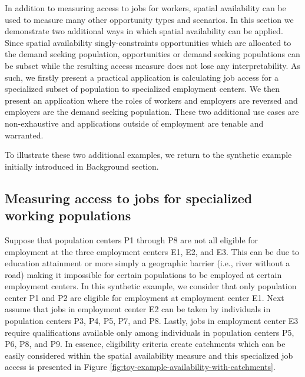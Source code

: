 \documentclass[]{elsarticle} %
\begin{document}
In addition to measuring access to jobs for workers, spatial
availability can be used to measure many other opportunity types and
scenarios. In this section we demonstrate two additional ways in which
spatial availability can be applied. Since spatial availability
singly-constraints opportunities which are allocated to the demand
seeking population, opportunities or demand seeking populations can be
subset while the resulting access measure does not lose any
interpretability. As such, we firstly present a practical application is
calculating job access for a specialized subset of population to
specialized employment centers. We then present an application where the
roles of workers and employers are reversed and employers are the demand
seeking population. These two additional use cases are non-exhaustive
and applications outside of employment are tenable and warranted.

To illustrate these two additional examples, we return to the synthetic
example initially introduced in
\protect\hypertarget{background}{}{Background} section.

\hypertarget{measuring-access-to-jobs-for-specialized-working-populations}{%
\subsection{Measuring access to jobs for specialized working
populations}\label{measuring-access-to-jobs-for-specialized-working-populations}}

Suppose that population centers P1 through P8 are not all eligible for
employment at the three employment centers E1, E2, and E3. This can be
due to education attainment or more simply a geographic barrier (i.e.,
river without a road) making it impossible for certain populations to be
employed at certain employment centers. In this synthetic example, we
consider that only population center P1 and P2 are eligible for
employment at employment center E1. Next assume that jobs in employment
center E2 can be taken by individuals in population centers P3, P4, P5,
P7, and P8. Lastly, jobs in employment center E3 require qualifications
available only among individuals in population centers P5, P6, P8, and
P9. In essence, eligibility criteria create catchments which can be
easily considered within the spatial availability measure and this
specialized job access is presented in Figure
\ref{fig:toy-example-availability-with-catchments}.
\end{document}
